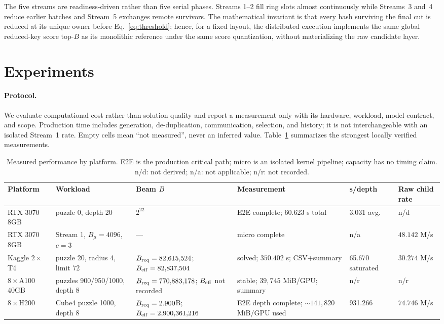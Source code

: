\documentclass[10pt,twocolumn]{article}
\newcommand{\beam}{B}
\begin{document}
The five streams are readiness-driven rather than five serial phases.  Streams
1--2 fill ring slots almost continuously while Streams~3 and~4 reduce earlier
batches and Stream~5 exchanges remote survivors.  The mathematical invariant is
that every hash surviving the final cut is reduced at its unique owner before
Eq.~\eqref{eq:threshold}; hence, for a fixed layout, the distributed execution
implements the same global reduced-key score top-$\beam$ as its monolithic
reference under the same score quantization, without materializing the raw
candidate layer.

\section{Experiments}
\paragraph{Protocol.}
We evaluate computational cost rather than solution quality and report a
measurement only with its hardware, workload, model contract, and scope.
Production time includes generation, de-duplication, communication, selection,
and history; it is not interchangeable with an isolated Stream~1 rate.  Empty
cells mean ``not measured'', never an inferred value.  Table~\ref{tab:platforms}
summarizes the strongest locally verified measurements.

\begin{table}[t]
\centering
\footnotesize
\caption{Measured performance by platform.  E2E is the production critical
path; micro is an isolated kernel pipeline; capacity has no timing claim.
n/d: not derived; n/a: not applicable; n/r: not recorded.}
\label{tab:platforms}
\setlength{\tabcolsep}{3pt}
\begin{tabular}{@{}p{2.0cm}p{2.4cm}p{3.8cm}p{3.2cm}p{1.8cm}p{1.8cm}@{}}
\toprule
Platform & Workload & Beam $B$ & Measurement & s/depth & Raw child rate \\
\midrule
RTX 3070 8GB & puzzle 0, depth 20 & $2^{22}$ & E2E complete; $60.623$ s total & 3.031 avg. & n/d \\
RTX 3070 8GB & Stream 1, $B_\mu=4096$, $c=3$ & --- & micro complete & n/a & $48.142$ M/s \\
Kaggle $2\times$T4 & puzzle 20, radius 4, limit 72 & $B_{\rm req}=82{,}615{,}524$; $B_{\rm eff}=82{,}837{,}504$ & solved; $350.402$ s; CSV+summary & 65.670 saturated & $30.274$ M/s \\
$8\times$A100 40GB & puzzles 900/950/1000, depth 8 & $B_{\rm req}=770{,}883{,}178$; $B_{\rm eff}$ not recorded & stable; $39{,}745$ MiB/GPU; summary & n/r & n/r \\
$8\times$H200 & Cube4 puzzle 1000, depth 8 & $B_{\rm req}=2.900$B; $B_{\rm eff}=2{,}900{,}361{,}216$ & E2E depth complete; $\sim141{,}820$ MiB/GPU used & 931.266 & $74.746$ M/s \\
\bottomrule
\end{tabular}
\end{table}
\end{document}
